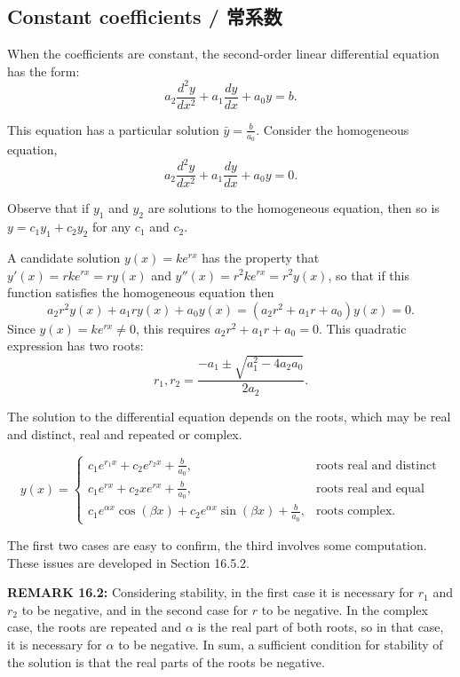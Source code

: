 \subsection{Constant coefficients / 常系数}

\begin{original}
When the coefficients are constant, the second-order linear differential equation has the form:
\[
a_2\frac{d^2 y}{dx^2} + a_1\frac{dy}{dx} + a_0 y = b.
\]

This equation has a particular solution $\bar{y} = \frac{b}{a_0}$. Consider the homogeneous equation,
\[
a_2\frac{d^2 y}{dx^2} + a_1\frac{dy}{dx} + a_0 y = 0.
\]

Observe that if $y_1$ and $y_2$ are solutions to the homogeneous equation, then so is $y = c_1 y_1 + c_2 y_2$ for any $c_1$ and $c_2$.

A candidate solution $y(x) = ke^{rx}$ has the property that $y'(x) = rke^{rx} = r y(x)$ and $y''(x) = r^2ke^{rx} = r^2 y(x)$, so that if this function satisfies the homogeneous equation then
\[
a_2 r^2 y(x) + a_1 r y(x) + a_0 y(x) = (a_2 r^2 + a_1 r + a_0)y(x) = 0.
\]
Since $y(x) = ke^{rx} \neq 0$, this requires $a_2 r^2 + a_1 r + a_0 = 0$. This quadratic expression has two roots:
\[
r_1, r_2 = \frac{-a_1 \pm \sqrt{a_1^2 - 4a_2 a_0}}{2a_2}.
\]

The solution to the differential equation depends on the roots, which may be real and distinct, real and repeated or complex.

\[
y(x) =
\begin{cases}
c_1 e^{r_1 x} + c_2 e^{r_2 x} + \frac{b}{a_0}, & \text{roots real and distinct}\\[4pt]
c_1 e^{r x} + c_2 x e^{r x} + \frac{b}{a_0}, & \text{roots real and equal}\\[4pt]
c_1 e^{\alpha x}\cos(\beta x) + c_2 e^{\alpha x}\sin(\beta x) + \frac{b}{a_0}, & \text{roots complex}.
\end{cases}
\]

The first two cases are easy to confirm, the third involves some computation. These issues are developed in Section 16.5.2.

\textbf{REMARK 16.2:} Considering stability, in the first case it is necessary for $r_1$ and $r_2$ to be negative, and in the second case for $r$ to be negative. In the complex case, the roots are repeated and $\alpha$ is the real part of both roots, so in that case, it is necessary for $\alpha$ to be negative. In sum, a sufficient condition for stability of the solution is that the real parts of the roots be negative.
\end{original}
